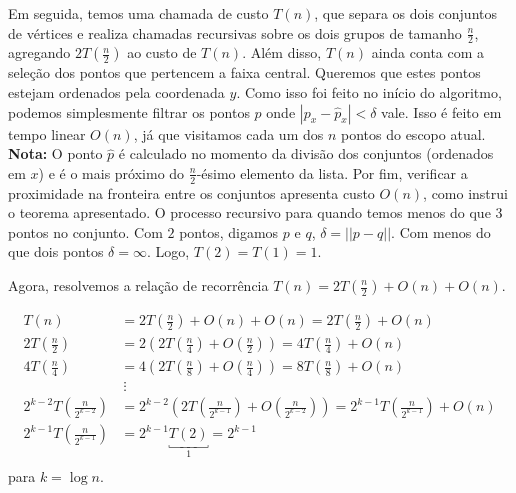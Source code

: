 \documentclass{homework}
\begin{document}
	Em seguida, temos uma chamada de custo {$T\left(n\right)$}, que separa os dois conjuntos de vértices e realiza chamadas recursivas sobre os dois grupos de tamanho $\frac{n}{2}$, agregando {$2 T\left(\frac{n}{2}\right)$} ao custo de $T\left(n\right)$. Além disso, $T\left(n\right)$ ainda conta com a seleção dos pontos que pertencem a faixa central. Queremos que estes pontos estejam ordenados pela coordenada $y$. Como isso foi feito no início do algoritmo, podemos simplesmente filtrar os pontos $p$ onde $|p_x - \hat{p}_x| < \delta$ vale. Isso é feito em tempo linear {$O\left(n\right)$}, já que visitamos cada um dos $n$ pontos do escopo atual. \textbf{Nota:} O ponto $\hat{p}$ é calculado no momento da divisão dos conjuntos (ordenados em $x$) e é o mais próximo do $\frac{n}{2}$-ésimo elemento da lista. Por fim, verificar a proximidade na fronteira entre os conjuntos apresenta custo {$O\left(n\right)$}, como instrui o teorema apresentado. O processo recursivo para quando temos menos do que $3$ pontos no conjunto. Com $2$ pontos, digamos $p$ e $q$, $\delta = ||p - q||.$ Com menos do que dois pontos $\delta = \infty$. Logo, {$T\left(2\right) = T\left(1\right) = 1$}. \par
	
	Agora, resolvemos a relação de recorrência  $T\left(n\right) = 2 T\left(\frac{n}{2}\right) + O\left(n\right) + O\left(n\right)$.\par
	
	\begin{align*}
		T\left(n\right) &= 2 T\left(\frac{n}{2}\right) + O\left(n\right) + O\left(n\right) = 2 T\left(\frac{n}{2}\right) + O\left(n\right) \\
		2 T\left(\frac{n}{2}\right) &= 2 \left(2 T\left(\frac{n}{4}\right) + O\left(\frac{n}{2}\right)\right) = 4 T\left(\frac{n}{4}\right) + O\left(n\right)\\
		4 T\left(\frac{n}{4}\right) &= 4 \left(2 T\left(\frac{n}{8}\right) + O\left(\frac{n}{4}\right)\right) = 8 T\left(\frac{n}{8}\right) + O\left(n\right)\\
		&~\vdots\\
		2^{k-2} T\left(\frac{n}{2^{k-2}}\right) &= 2^{k-2} \left(2 T\left(\frac{n}{2^{k-1}}\right) + O\left(\frac{n}{2^{k-2}}\right)\right) = 2^{k-1} T\left(\frac{n}{2^{k-1}}\right) + O\left(n\right)\\
		2^{k-1} T\left(\frac{n}{2^{k-1}}\right) &= 2^{k-1} \underbracket{T\left(2\right)}_{1} = 2^{k-1}\\
	\end{align*}
	para $k = \log n$. \par
	
\end{document}
